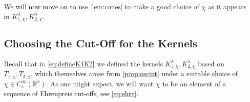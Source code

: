 \documentclass[
	fontsize=11pt, 
	twoside=false, 
	abstract=true, 
	a4paper,
]{scrartcl}
\newcommand{\sem}{\setminus\{0\}}
\newcommand{\RR}{\mathbb{R}}
\begin{document}
We will now move on to use \cref{lem:cones} to make a good choice of $\chi$ as it appears in $K_{1,\chi}^\lambda, K_{2,\chi}^\lambda$.

\subsection{Choosing the Cut-Off for the Kernels}\label{sec:choosechi}

Recall that in \cref{eq:defineK1K2} we defined the kernels $K_{1,\chi}^\lambda, K_{2,\chi}^\lambda$ based on $T_{1,\chi}, T_{2,\chi}$, which themselves arose from \cref{prop:oscint} under a suitable choice of $\chi \in C_c^\infty(\RR^n)$. %
As one might expect, we will want $\chi$ to be an element of a sequence of Ehrenpreis cut-offs, see \cref{eq:ehre}. 
\end{document}
